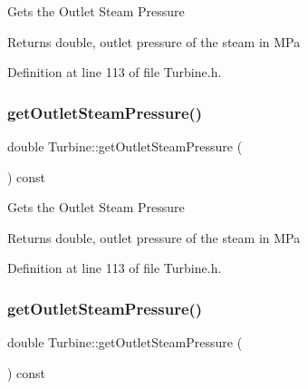 Gets the Outlet Steam Pressure

\begin{DoxyReturn}{Returns}
double, outlet pressure of the steam in M\+Pa 
\end{DoxyReturn}


Definition at line 113 of file Turbine.\+h.

\mbox{\label{class_turbine_a1589b2364a553db7aaa875bb543d171d}} 
\subsubsection{\texorpdfstring{get\+Outlet\+Steam\+Pressure()}{getOutletSteamPressure()}\hspace{0.1cm}{\footnotesize\ttfamily [2/3]}}
{\footnotesize\ttfamily double Turbine\+::get\+Outlet\+Steam\+Pressure (\begin{DoxyParamCaption}{ }\end{DoxyParamCaption}) const\hspace{0.3cm}{\ttfamily [inline]}}

Gets the Outlet Steam Pressure

\begin{DoxyReturn}{Returns}
double, outlet pressure of the steam in M\+Pa 
\end{DoxyReturn}


Definition at line 113 of file Turbine.\+h.

\mbox{\label{class_turbine_a1589b2364a553db7aaa875bb543d171d}} 
\subsubsection{\texorpdfstring{get\+Outlet\+Steam\+Pressure()}{getOutletSteamPressure()}\hspace{0.1cm}{\footnotesize\ttfamily [3/3]}}
{\footnotesize\ttfamily double Turbine\+::get\+Outlet\+Steam\+Pressure (\begin{DoxyParamCaption}{ }\end{DoxyParamCaption}) const\hspace{0.3cm}{\ttfamily [inline]}}


